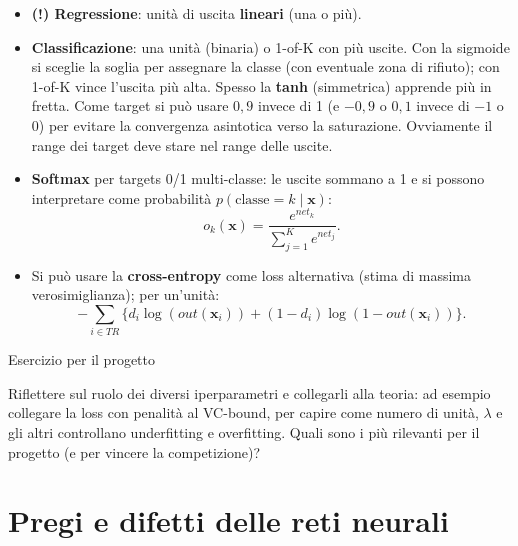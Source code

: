 \begin{itemize}
\tightlist
\item
  \textbf{(!) Regressione}: unità di uscita \textbf{lineari} (una o
  più).
\item
  \textbf{Classificazione}: una unità (binaria) o 1-of-K con più uscite.
  Con la sigmoide si sceglie la soglia per assegnare la classe (con
  eventuale zona di rifiuto); con 1-of-K vince l'uscita più alta. Spesso
  la \textbf{tanh} (simmetrica) apprende più in fretta. Come target si
  può usare \(0{,}9\) invece di 1 (e \(-0{,}9\) o \(0{,}1\) invece di
  \(-1\) o \(0\)) per evitare la convergenza asintotica verso la
  saturazione. Ovviamente il range dei target deve stare nel range delle
  uscite.
\item
  \textbf{Softmax} per targets 0/1 multi-classe: le uscite sommano a 1 e
  si possono interpretare come probabilità
  \(p(\text{classe} = k \mid \mathbf{x})\): \[
  o_k(\mathbf{x}) = \frac{e^{net_k}}{\sum_{j=1}^{K} e^{net_j}}.
  \]
\item
  Si può usare la \textbf{cross-entropy} come loss alternativa (stima di
  massima verosimiglianza); per un'unità: \[
  -\sum_{i \in TR}\big\{d_i\log(out(\mathbf{x}_i)) + (1 - d_i)\log(1 - out(\mathbf{x}_i))\big\}.
  \]
\end{itemize}

\begin{boxquestion}{Esercizio per il progetto}

Riflettere sul ruolo dei diversi iperparametri e collegarli alla teoria:
ad esempio collegare la loss con penalità al VC-bound, per capire come
numero di unità, \(\lambda\) e gli altri controllano underfitting e
overfitting. Quali sono i più rilevanti per il progetto (e per vincere
la competizione)?

\end{boxquestion}

\section{Pregi e difetti delle reti
neurali}\label{pregi-e-difetti-delle-reti-neurali}

